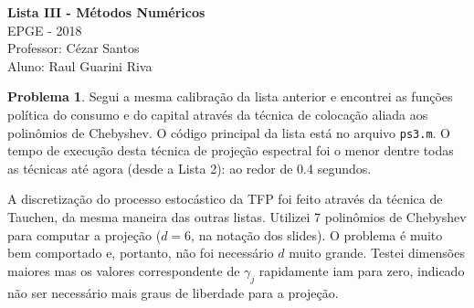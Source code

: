 \documentclass[11pt]{article}
\theoremstyle{definition}
\newtheorem{prob}{Problema}
\theoremstyle{solution}
\begin{document}
	\begin{center}
		{\Large{\textbf{Lista III - Métodos Numéricos}}}\\
		\vspace{0.2cm}
		EPGE - 2018\\
		Professor: Cézar Santos\\
		Aluno: Raul Guarini Riva
	\end{center}
	
\begin{prob}
	Segui a mesma calibração da lista anterior e encontrei as funções política do consumo e do capital através da técnica de colocação aliada aos polinômios de Chebyshev. O código principal da lista está no arquivo \texttt{ps3.m}. O tempo de execução desta técnica de projeção espectral foi o menor dentre todas as técnicas até agora (desde a Lista 2): ao redor de 0.4 segundos.
	
	A discretização do processo estocástico da TFP foi feito através da técnica de Tauchen, da mesma maneira das outras listas. Utilizei 7 polinômios de Chebyshev para computar a projeção ($d = 6$, na notação dos slides). O problema é muito bem comportado e, portanto, não foi necessário $d$ muito grande. Testei dimensões maiores mas os valores correspondente de $\gamma_{j}$ rapidamente iam para zero, indicado não ser necessário mais graus de liberdade para a projeção.
	

\end{prob}
\end{document}
